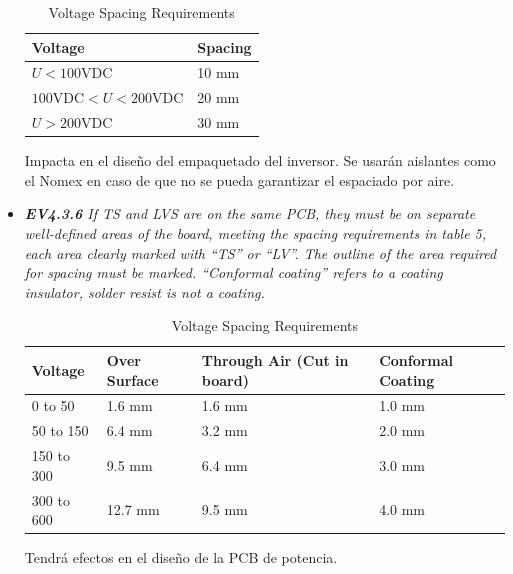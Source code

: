 \begin{itemize}
	\begin{table}[H]
		\centering
		\caption{Voltage Spacing Requirements}
		\begin{tabular}{|l|l|}
			\hline
			Voltage         & Spacing     \\ \hline
			\(U < 100 \text{VDC}\)  & 10 mm       \\ \hline
			\(100 \text{VDC} < U < 200 \text{VDC}\) & 20 mm       \\ \hline
			\(U > 200 \text{VDC}\)  & 30 mm       \\ \hline
		\end{tabular}
	\end{table} Impacta en el diseño del empaquetado del inversor.  Se usarán aislantes como el Nomex en caso de que no se pueda garantizar el espaciado por aire.
    \item \textit{\textbf{EV4.3.6} If TS and LVS are on the same PCB, they must be on separate well-defined areas of the board, meeting the spacing requirements in table 5, each area clearly marked with “TS” or “LV”. The outline of the area required for spacing must  be marked. “Conformal coating” refers to a coating insulator, solder resist is not a coating.}
    
	\begin{table}[H]
		\centering
		\caption{Voltage Spacing Requirements}
		\begin{tabular}{|l|l|l|l|}
			\hline
			Voltage & Over Surface & Through Air (Cut in board) & Conformal Coating \\
			\hline
			0 to 50 & 1.6 mm & 1.6 mm & 1.0 mm \\
			\hline
			50 to 150 & 6.4 mm & 3.2 mm & 2.0 mm \\
			\hline
			150 to 300 & 9.5 mm & 6.4 mm & 3.0 mm \\
			\hline
			300 to 600 & 12.7 mm & 9.5 mm & 4.0 mm \\
			\hline
		\end{tabular}
	\end{table} Tendrá efectos en el diseño de la PCB de potencia.


\end{itemize}
